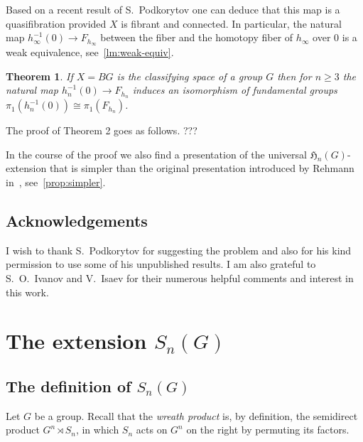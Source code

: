 \documentclass[oneside, 12pt]{amsart}
\theoremstyle{plain}
\newtheorem{thm}{Theorem}
\numberwithin{equation}{section}
\numberwithin{lemma}{section}
\theoremstyle{remark}
\theoremstyle{definition}
\begin{document}
Based on a recent result of S.~Podkorytov one can deduce that this map is a quasifibration provided $X$ is fibrant and connected.
In particular, the natural map $h^{-1}_\infty(0) \to F_{h_\infty}$ between the fiber and the homotopy fiber of $h_\infty$ over $0$ is a weak equivalence, see~\cref{lm:weak-equiv}.
\begin{comment}
For finite $n$ this no longer remains true, however one may expect that the homotopy groups of $h^{-1}_n(0)$ and $F_{h_n}$ are still
 isomorphic in small degrees.
S. Podkorytov conjectured that the natural map $h^{-1}_n(0) \to F_{h_n}$ is $c_n$-connected where $c_n$ tends to infinity as $n\to \infty$.
The main goal of this note is to show the following result which confirms this conjecture in one special case.
\end{comment}
\begin{thm} \label{thm:main} If $X=BG$ is the classifying space of a group $G$ then for $n\geq 3$
 the natural map $h_n^{-1}(0) \to F_{h_n}$ induces an isomorphism of fundamental groups
 $\pi_1(h^{-1}_n(0))\cong \pi_1(F_{h_n})$. \end{thm}

The proof of Theorem 2 goes as follows. ???
 
In the course of the proof we also find a presentation of the universal $\mathfrak{H}_n(G)$-extension 
 that is simpler than the original presentation introduced by Rehmann in~\cite{Reh78}, see~\cref{prop:simpler}.

\subsection{Acknowledgements}
I wish to thank S.~Podkorytov for suggesting the problem and also for his kind permission to use some of his unpublished results.
I am also grateful to S.~O.~Ivanov and V.~Isaev for their numerous helpful comments and interest in this work.

\section{The extension $S_n(G)$} 
\subsection{The definition of $S_n(G)$} \label{sec:QnG-def}
Let $G$ be a group. Recall that the {\it wreath product} is, by definition,
 the semidirect product $G^n \rtimes S_n$, in which $S_n$ acts on $G^n$ on the right by permuting its factors.
\end{document}
